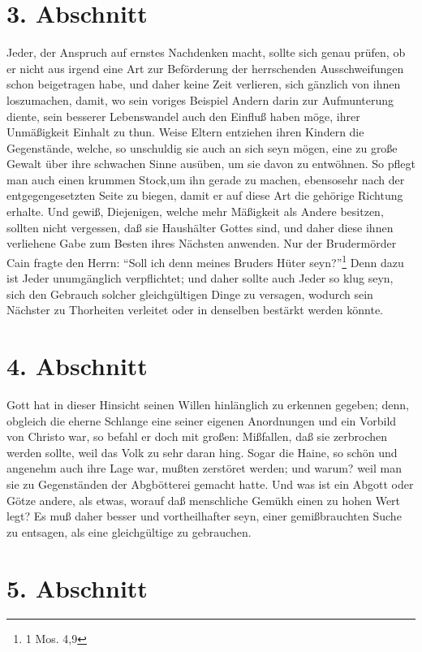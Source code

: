 \section{3. Abschnitt}

Jeder, der Anspruch auf ernstes Nachdenken macht, sollte sich genau prüfen, ob er nicht aus irgend eine Art zur Beförderung der herrschenden Ausschweifungen schon beigetragen habe, und daher keine Zeit verlieren, sich gänzlich von ihnen loszumachen, damit, wo sein voriges Beispiel Andern darin zur Aufmunterung diente, sein besserer Lebenswandel auch den Einfluß haben möge, ihrer Unmäßigkeit Einhalt zu thun. Weise Eltern entziehen ihren Kindern die Gegenstände, welche, so unschuldig sie auch an sich seyn mögen, eine zu große Gewalt über ihre schwachen Sinne ausüben, um sie davon zu entwöhnen. So pflegt man auch einen krummen Stock,um ihn gerade zu machen, ebensosehr nach der entgegengesetzten Seite zu biegen, damit er auf diese Art die gehörige Richtung erhalte. Und gewiß, Diejenigen, welche mehr Mäßigkeit als Andere besitzen, sollten nicht vergessen, daß sie Haushälter Gottes sind, und daher diese ihnen verliehene Gabe zum Besten ihres Nächsten anwenden. Nur der Brudermörder Cain fragte den Herrn: "`Soll ich denn meines Bruders Hüter seyn?"'\footnote{1 Mos. 4,9} Denn dazu ist Jeder unumgänglich verpflichtet; und daher sollte auch Jeder so klug seyn, sich den Gebrauch solcher gleichgültigen Dinge zu versagen, wodurch sein Nächster zu Thorheiten verleitet oder in denselben bestärkt werden könnte.

\section{4. Abschnitt}

Gott hat in dieser Hinsicht seinen Willen hinlänglich zu erkennen gegeben; denn, obgleich die eherne Schlange eine seiner eigenen Anordnungen und ein Vorbild von Christo war, so befahl er doch mit großen: Mißfallen, daß sie zerbrochen werden sollte, weil das Volk zu sehr daran hing. Sogar die Haine, so schön und angenehm auch ihre Lage war, mußten zerstöret werden; und warum? weil man sie zu Gegenständen der Abgbötterei gemacht hatte. Und was ist ein Abgott oder Götze andere, als etwas, worauf daß menschliche Gemükh einen zu hohen Wert legt? Es muß daher besser und vortheilhafter seyn, einer gemißbrauchten Suche zu entsagen, als eine gleichgültige zu gebrauchen.

\section{5. Abschnitt}

